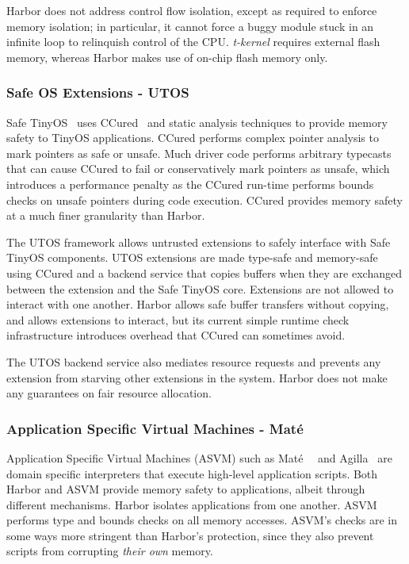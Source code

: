 Harbor does not address control flow isolation, except as required to
enforce memory isolation; in particular, it cannot force a buggy module
stuck in an infinite loop to relinquish control of the CPU.
%
\emph{t-kernel} requires external flash memory, whereas Harbor makes use of
on-chip flash memory only.
%
\subsubsection{Safe OS Extensions - UTOS}
%
Safe TinyOS~\cite{regehr06utos} uses CCured~\cite{ccured02necula} and static
analysis techniques to provide memory safety to TinyOS applications.
%
CCured performs complex pointer analysis to mark pointers as safe or
unsafe.
%
Much driver code performs arbitrary typecasts that can cause CCured to
fail or conservatively mark pointers as unsafe, which introduces a
performance penalty as the CCured run-time performs bounds checks on
unsafe pointers during code execution.
%
CCured provides memory safety at a much finer granularity than Harbor.
%

The UTOS framework allows untrusted extensions to
safely interface with Safe TinyOS components.
%
UTOS extensions are made type-safe and memory-safe using CCured and a
backend service that copies buffers when they are exchanged between the
extension and the Safe TinyOS core.
%
Extensions are not allowed to interact with one another.
%
Harbor allows safe buffer transfers without copying, and allows extensions
to interact, but its current simple runtime check infrastructure introduces
overhead that CCured can sometimes avoid.
%

The UTOS backend service also mediates resource requests and prevents any
extension from starving other extensions in the system.
%
Harbor does not make any guarantees on fair resource allocation.
%
\subsubsection{Application Specific Virtual Machines - Mat\'e}
%
Application Specific Virtual Machines (ASVM) such as
Mat\'e~\cite{asvm05nsdi}~\cite{levis02mate} and
Agilla~\cite{agilla05ipsn} are domain specific interpreters that
execute high-level application scripts.
%
Both Harbor and ASVM provide memory safety to applications, albeit
through different mechanisms.
%
Harbor isolates applications from one another.
%
ASVM performs type and bounds checks on all memory accesses.
%
ASVM's checks are in some ways more stringent than Harbor's protection,
since they also prevent scripts from corrupting \emph{their own}
memory.
%

